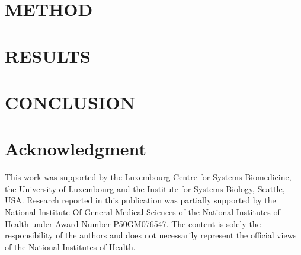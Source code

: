 \documentclass[conference]{IEEEtran}
\begin{document}
\section{METHOD}





\section{RESULTS}








\section{CONCLUSION}





\section*{Acknowledgment}

This work was supported by the Luxembourg Centre for Systems Biomedicine, the University of Luxembourg and the Institute for Systems Biology, Seattle, USA. Research reported in this publication was partially supported by the National Institute Of General Medical Sciences of the National Institutes of Health under Award Number P50GM076547. The content is solely the responsibility of the authors and does not necessarily represent the official views of the National Institutes of Health.




\begin{small}




\end{small}
\end{document}
